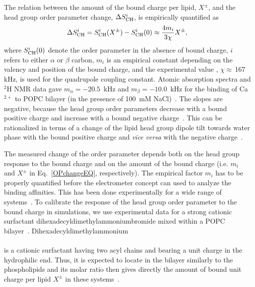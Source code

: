 \documentclass[aip,jcp,twocolumn]{revtex4}
\begin{document}
The relation between the amount of the bound charge per lipid,  $X^\pm$, and
the head group order parameter change, $\Delta S_{\rm{CH}}^{i}$,
is empirically quantified as~\cite{seelig87,ferreira16}
\begin{equation}\label{OPchangeEQ}
  \Delta S_{\rm{CH}}^{i}= S_{\rm{CH}}^{i}(X^\pm)-S_{\rm{CH}}^{i}(0) \approx \frac{4m_i }{3\chi}X^\pm,
\end{equation}
where $S_{\rm{CH}}^{i}(0)$ denote the order parameter in the absence of bound charge,
$i$ refers to either $\alpha$ or $\beta$ carbon,
$m_i$ is an empirical constant depending on the valency and position of the bound charge,
and the experimental value \cite{seelig77,davis83}, $\chi \approx$\,167\,kHz, is used for the quadrupole coupling constant.
Atomic absorption spectra and $^2$H NMR data gave
$m_\alpha=-20.5$~kHz  and $m_\beta=-10.0$~kHz for the binding of
Ca$^{2+}$ to POPC bilayer (in the presence of 100~mM NaCl)~\cite{altenbach84,ollila16,catte16}.
The slopes are negative, because the head group order parameters
decrease with a bound positive charge and increase with a bound negative
charge~\cite{ollila16,catte16}. This can be rationalized in terms of a change
of the lipid head group dipole tilt towards water phase with the bound positive
charge and {\it vice versa} with the negative charge~\cite{seelig87}. 

The measured change of the order parameter depends both on the head group response 
to the bound charge and on the amount of the bound charge 
(i.e. $m_i$ and $X^\pm$ in Eq.~\ref{OPchangeEQ}, respectively). 
The empirical factor $m_i$ has to be
properly quantified before the electrometer concept can used to 
analyze the binding affinities.
This has been done experimentally for a wide range
of systems~\cite{seelig87,beschiasvili91}. To calibrate 
the response of the head group order parameter to the bound charge in simulations,
we use experimental data for a strong cationic surfactant dihexadecyldimethylammoniumbromide %
mixed within a POPC bilayer~\cite{scherer89}. Dihexadecyldimethylammonium\\[0.5cm]
\vspace{0.5cm} \\
is a cationic surfactant having two acyl chains and bearing a unit
charge in the hydrophilic end. Thus, it is expected to locate
in the bilayer similarly to the phospholipids and its molar ratio then 
gives directly the amount of bound unit charge per lipid $X^\pm$ in these systems~\cite{scherer89}.
\end{document}
